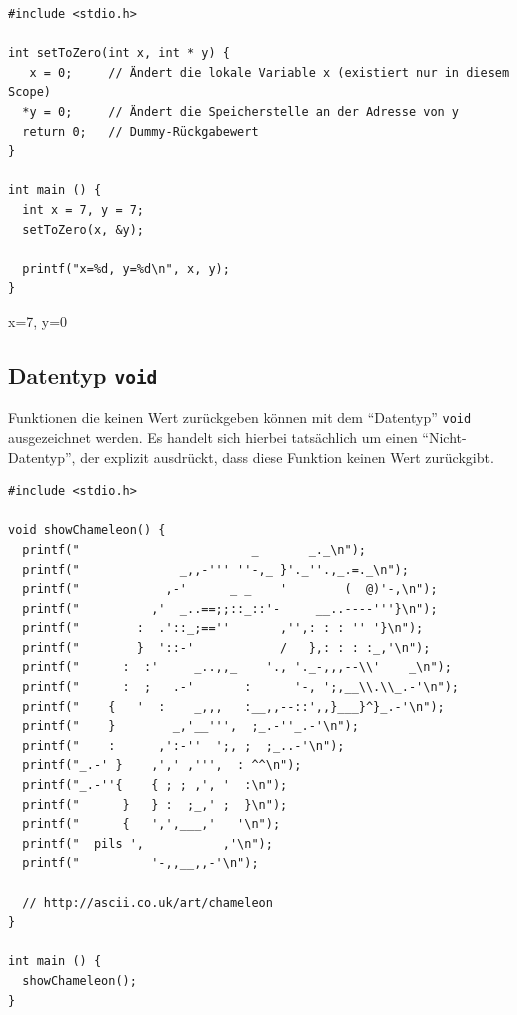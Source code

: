 \begin{codebox}
\begin{verbatim}
#include <stdio.h>

int setToZero(int x, int * y) {
   x = 0;     // Ändert die lokale Variable x (existiert nur in diesem Scope)
  *y = 0;     // Ändert die Speicherstelle an der Adresse von y
  return 0;   // Dummy-Rückgabewert
}

int main () {
  int x = 7, y = 7;
  setToZero(x, &y);

  printf("x=%d, y=%d\n", x, y);
}
\end{verbatim}
\end{codebox}

\begin{cmdbox}
x=7, y=0
\end{cmdbox}

\subsection{Datentyp \texttt{void}}
Funktionen die keinen Wert zurückgeben können mit dem \enquote{Datentyp} \texttt{void} ausgezeichnet werden. Es handelt sich hierbei tatsächlich um einen \enquote{Nicht-Datentyp}, der explizit ausdrückt, dass diese Funktion keinen Wert zurückgibt.

\begin{codebox}
\begin{verbatim}
#include <stdio.h>

void showChameleon() {
  printf("                        _       _._\n");
  printf("              _,,-''' ''-,_ }'._''.,_.=._\n");
  printf("            ,-'      _ _    '        (  @)'-,\n");
  printf("          ,'  _..==;;::_::'-     __..----'''}\n");
  printf("        :  .'::_;==''       ,'',: : : '' '}\n");
  printf("        }  '::-'            /   },: : : :_,'\n");
  printf("      :  :'     _..,,_    '., '._-,,,--\\'    _\n");
  printf("      :  ;   .-'       :      '-, ';,__\\.\\_.-'\n");
  printf("    {   '  :    _,,,   :__,,--::',,}___}^}_.-'\n");
  printf("    }        _,'__''',  ;_.-''_.-'\n");
  printf("    :      ,':-''  ';, ;  ;_..-'\n");
  printf("_.-' }    ,',' ,''',  : ^^\n");
  printf("_.-''{    { ; ; ,', '  :\n");
  printf("      }   } :  ;_,' ;  }\n");
  printf("      {   ',',___,'   '\n");
  printf("  pils ',           ,'\n");
  printf("          '-,,__,,-'\n");

  // http://ascii.co.uk/art/chameleon
}

int main () {
  showChameleon();
}
\end{verbatim}
\end{codebox}


